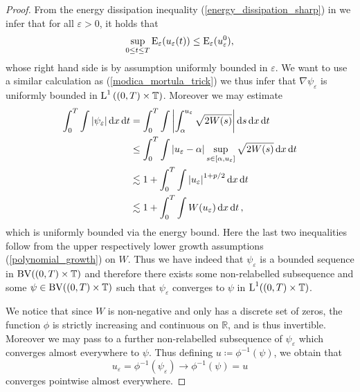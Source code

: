 \begin{proof}
	From the energy dissipation inequality (\ref{energy_dissipation_sharp}) in  we infer that for all $ \varepsilon > 0 $, it holds that
	\begin{equation}
		\label{unif_bound_on_energies}
		\sup_{ 0 \leq t \leq T }
			\operatorname{E}_{ \varepsilon } ( u_{ \varepsilon } ( t ) ) 
		\leq
		\operatorname{E}_{ \varepsilon } ( u_{ \varepsilon}^{ 0 } ),
	\end{equation}
	whose right hand side is by assumption uniformly bounded in $ \varepsilon $.
	We want to use a similar calculation as (\ref{modica_mortula_trick}) we thus infer that $ \nabla \psi_{ \varepsilon } $ is uniformly bounded in $ \operatorname{L}^{ 1 } \left( ( 0 , T ) \times \operatorname{\mathbb{T}} \right) $.
	Moreover we may estimate
	\begin{align}
		\int_{ 0 }^{ T }
			\int
				\abs{ \psi_{ \varepsilon } }
			\dd{ x }
		\dd{ t }
		& =
		\int_{ 0 }^{ T }
			\int
				\abs{
					\int_{ \alpha }^{ u_{ \varepsilon } }
						\sqrt{ 2 W ( s ) }
				}
					\dd{ s }
			\dd{ x }
		\dd{ t }
		\notag
		\\
		& \leq
		\int_{ 0 }^{ T }
			\int
				\abs{ u_{ \varepsilon } - \alpha }
				\sup_{ s \in [ \alpha, u_{ \varepsilon } ] }
					\sqrt{ 2 W ( s ) }
			\dd{ x }
		\dd{ t }
		\notag
		\\
		& \lesssim
		1 + 
		\int_{ 0 }^{ T }
			\int
				\abs{ u_{ \varepsilon } }^{ 1 + p/ 2 }
			\dd{ x }
		\dd{ t }
		\notag
		\\
		& \lesssim
		1 + 
		\int_{ 0 }^{ T }
			\int
				W ( u_{ \varepsilon } )
			\dd{ x }
		\dd{ t },
		\label{l1_estimate_for_psi_epsilon}
	\end{align}
	which is uniformly bounded via the energy bound. Here the last two inequalities follow from the upper respectively lower growth assumptions (\ref{polynomial_growth}) on $ W $. Thus we have indeed that $ \psi_{ \varepsilon } $ is a bounded sequence in $ \operatorname{BV}( ( 0 , T ) \times \operatorname{\mathbb{T}} ) $ and therefore there exists some non-relabelled subsequence and some $ \psi \in \operatorname{BV} ( ( 0 , T ) \times \operatorname{\mathbb{T}} ) $ such that $ \psi_{ \varepsilon } $ converges to $ \psi $ in $ \operatorname{L}^{ 1 } ( ( 0 , T ) \times \operatorname{\mathbb{T}} ) $.
	
	We notice that since $ W $ is non-negative and only has a discrete set of zeros, the function $ \phi $ is strictly increasing and continuous on $ \mathbb{ R } $, and is thus invertible. Moreover we may pass to a further non-relabelled subsequence of $ \psi_{ \varepsilon } $ which converges almost everywhere to $ \psi $. 
	Thus defining $ u \coloneqq \phi^{ - 1 } ( \psi ) $, we obtain that
	\begin{equation*}
		u_{ \varepsilon } = \phi^{ - 1 } ( \psi_{ \varepsilon } ) \to \phi^{ - 1 } ( \psi ) = u
	\end{equation*}
	converges pointwise almost everywhere.
	

\end{proof}
